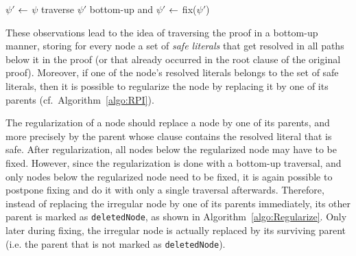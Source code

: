 \begin{algorithm}[b]
\begin{footnotesize}


\BlankLine

$\psi'$ $\leftarrow$ $\psi$\;
traverse $\psi'$ bottom-up and 
$\psi'$ $\leftarrow$ fix($\psi'$) \;
\;
\caption{\label{algo:RPI} \texttt{\RPI}}
\end{footnotesize}
\end{algorithm}


These observations lead to the idea of traversing the proof in a bottom-up
manner, storing for every node a set of \emph{safe literals} that get resolved
in all paths below it in the proof (or that already occurred in the root clause
of the original proof). Moreover, if one of the node's resolved literals belongs
to the set of safe literals, then it is possible to regularize the node by
replacing it by one of its parents (cf.\ Algorithm~\ref{algo:RPI}). 

The regularization of a node should replace a node by one of its parents, and more precisely by the parent whose clause contains the resolved literal that is safe. After regularization, all nodes below the regularized node may have to be fixed. However, since the regularization is done with a bottom-up traversal, and only nodes below the regularized node need to be fixed, it is again possible to postpone fixing and do it with only a single traversal afterwards. 
Therefore, instead of replacing the irregular node by one of its parents immediately, 
its other parent is marked as \texttt{deletedNode}, as shown in Algorithm~\ref{algo:Regularize}. Only later during fixing, 
the irregular node is actually replaced by its surviving parent (i.e. the parent that is not marked as \texttt{deletedNode}).



